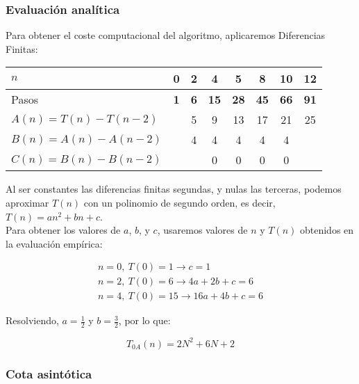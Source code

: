 \subsubsection*{Evaluación analítica}
Para obtener el coste computacional del algoritmo, aplicaremos Diferencias Finitas:

\begin{table}[h]
    \centering
    \begin{tabular}{|l|c|c|c|c|c|c|c|}
        \hline
        $n$ & \textbf{0} & \textbf{2} & \textbf{4} & \textbf{5} & \textbf{8} & \textbf{10} & \textbf{12} \\ \hline
        Pasos & \textbf{1} & \textbf{6} & \textbf{15} & \textbf{28} & \textbf{45} & \textbf{66} & \textbf{91} \\ \hline
        \hline
        $A(n) = T(n) - T(n-2)$ &    &  5 &  9 & 13 & 17 & 21 & 25 \\ \hline
        $B(n) = A(n) - A(n-2)$ &    &  4 &  4 &  4 &  4 &  4 &    \\ \hline
        $C(n) = B(n) - B(n-2)$ &    &    &  0 &  0 &  0 &  0 &    \\ \hline
    \end{tabular}
\end{table}

Al ser constantes las diferencias finitas segundas, y nulas las terceras, podemos aproximar $T(n)$ con un polinomio de segundo orden, es decir, $T(n) = an^2 + bn + c$.\\

Para obtener los valores de $a$, $b$, y $c$, usaremos valores de $n$ y $T(n)$ obtenidos en la evaluación empírica:

\begin{subequations}
    \begin{gather}
        n = 0,\ T(0) = 1 \rightarrow c = 1 \\
        n = 2,\ T(0) = 6 \rightarrow 4a + 2b + c = 6 \\
        n = 4,\ T(0) = 15 \rightarrow 16a + 4b + c = 6
    \end{gather}
\end{subequations}

Resolviendo, $a=\frac{1}{2}$ y $b=\frac{3}{2}$, por lo que:

\begin{equation}
    T_{0A}(n) = 2N^2 + 6N + 2
\end{equation}


\subsubsection*{Cota asintótica}

